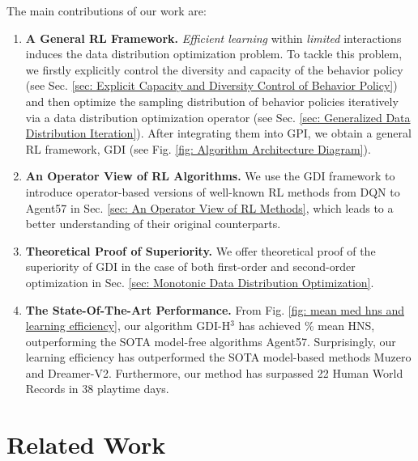 The main contributions of our work are: 
\begin{enumerate}
    \item \textbf{A General RL Framework.} \emph{Efficient learning}  within \emph{limited} interactions induces the data distribution optimization problem. To tackle this problem, we firstly explicitly  control the diversity and capacity of the behavior policy (see Sec. \ref{sec: Explicit  Capacity and Diversity  Control of Behavior Policy}) and  then optimize the sampling distribution of behavior policies iteratively via a data distribution optimization operator (see Sec. \ref{sec: Generalized Data Distribution Iteration}). After integrating  them into GPI, we obtain a general RL framework, GDI (see Fig. \ref{fig: Algorithm Architecture Diagram}).
    
    \item \textbf{An Operator View of RL Algorithms.} We use the GDI framework to introduce operator-based versions of well-known RL methods from DQN to Agent57 in Sec. \ref{sec: An Operator View of RL Methods}, which leads to a better understanding of their original counterparts.

    \item \textbf{Theoretical Proof of Superiority.}  We offer theoretical proof of the superiority of GDI in the case of both first-order and second-order optimization in Sec. \ref{sec: Monotonic Data Distribution Optimization}.

    \item \textbf{The State-Of-The-Art Performance.} From Fig. \ref{fig: mean med hns and learning efficiency}, our algorithm GDI-H$^3$ has achieved \GDIHmeanhns\% mean HNS, outperforming the SOTA model-free algorithms Agent57. Surprisingly, our learning efficiency has outperformed the SOTA model-based methods Muzero and Dreamer-V2. Furthermore, our method has surpassed 22 Human World Records in 38 playtime days.
\end{enumerate}




\section{ Related Work}
\label{sec:Problem Formulation and Related Work}


